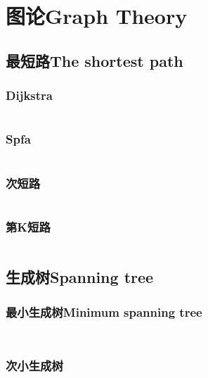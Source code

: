 \documentclass[twoside,sub3section,UTF8]{ctexart}						%
\begin{document}
\newpage
\section{图论Graph Theory}
	\subsection{最短路The shortest path}
		\subsubsection{Dijkstra}
		\inputminted[breaklines]{c++}{"Gragh Theory/The shortest path/dijkstra.cpp"}
		\subsubsection{Spfa}
		\inputminted[breaklines]{c++}{"Gragh Theory/The shortest path/spfa.cpp"}
		\subsubsection{次短路}
		\inputminted[breaklines]{c++}{"Gragh Theory/The shortest path/secdij.cpp"}
		\subsubsection{第K短路}
		\inputminted[breaklines]{c++}{"Gragh Theory/The shortest path/Astar.cpp"}

	\subsection{生成树Spanning tree}
		\subsubsection{最小生成树Minimum spanning tree}
		\inputminted[breaklines]{c++}{"Gragh Theory/MST/kruskal.cpp"}
		\inputminted[breaklines]{c++}{"Gragh Theory/MST/prim.cpp"}
		\subsubsection{次小生成树}
		\inputminted{c++}{"Gragh Theory/MST/secmst.cpp"}
		
\end{document}

